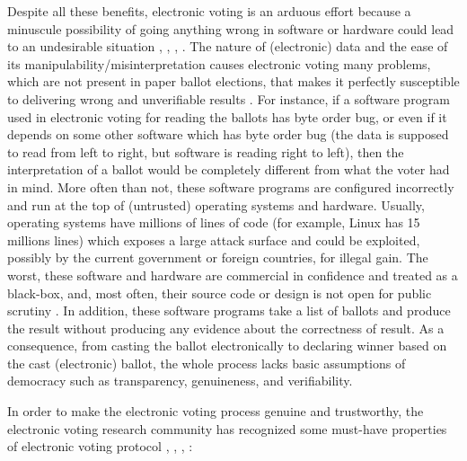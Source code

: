    
  Despite all these benefits, electronic voting is an arduous effort because a minuscule possibility of 
  going anything wrong in software or hardware could lead to an undesirable situation \citep{TSwiss},
  \citep{10.1007/978-3-319-22270-7_3}, \citep{ARANHA2019335},
  \citep{Feldman:2007:SAD:1323111.1323113}.  The nature of (electronic) data and the ease of 
  its manipulability/misinterpretation causes electronic voting many problems, which are not present in paper ballot elections, that 
  makes it perfectly susceptible to delivering wrong and unverifiable results \citep{Wolchok:2010:SAI:1866307.1866309}.
  For instance,  if a software program used in electronic voting 
  for reading the ballots has byte order bug, or even if it depends on some other software which has byte order bug (the data is supposed to read 
  from left to right, but software is reading right to left), then the interpretation of 
  a ballot would be completely different from what the voter had in mind.
  More often than not, these software programs are configured incorrectly \citep{1301313} and run at the top of (untrusted) operating 
  systems and hardware. Usually, operating systems have millions of lines of code (for example, Linux has 15 millions lines) which exposes
  a large attack surface and could be exploited, possibly by the current government or foreign countries, for illegal gain.
  The worst, these software and hardware  are commercial in 
  confidence and treated as a black-box, and, most often, their source code or design is not open 
  for public scrutiny \citep{AEC:2013:LMM}. In addition, these software programs 
  take a list of ballots and produce the result without producing any evidence about the correctness of result.  As a consequence,
  from casting the ballot electronically to declaring winner based on the cast (electronic) ballot, the whole process lacks basic assumptions
  of democracy such as transparency, genuineness, and verifiability. 
  
  In order to make the electronic voting process genuine and trustworthy, the electronic voting 
  research community has recognized some must-have properties of electronic voting protocol
  \citep{5958051}, 
   \citep{Benaloh:1994:RSE:195058.195407},  \citep{Delaune:2010:VPT}, \citep{Bernhard:2017:PES}:
  

